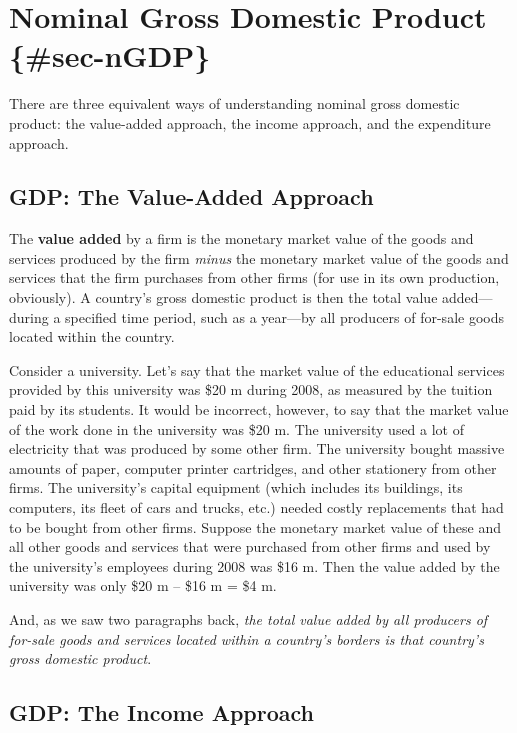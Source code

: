 \documentclass[
  letterpaper,
]{book}
\begin{document}
\section{\texorpdfstring{Nominal Gross Domestic Product \{\#sec-nGDP\}
}{Nominal Gross Domestic Product \{\#sec-nGDP\} }}\label{nominal-gross-domestic-product-sec-ngdp}

There are three equivalent ways of understanding nominal gross domestic
product: the value-added approach, the income approach, and the
expenditure approach.

\subsection{GDP: The Value-Added Approach}\label{sec-gdp-value-added}

The \textbf{value added} by a firm is the monetary
market value of the goods and services produced by the firm \emph{minus}
the monetary market value of the goods and services that the firm
purchases from other firms (for use in its own production, obviously). A
country's gross domestic product is then the total value added---during
a specified time period, such as a year---by all producers of for-sale
goods located within the country.

Consider a university. Let's say that the market value of the
educational services provided by this university was \$20 m during 2008,
as measured by the tuition paid by its students. It would be incorrect,
however, to say that the market value of the work done in the university
was \$20 m. The university used a lot of electricity that was produced
by some other firm. The university bought massive amounts of paper,
computer printer cartridges, and other stationery from other firms. The
university's capital equipment (which includes its buildings, its
computers, its fleet of cars and trucks, etc.) needed costly
replacements that had to be bought from other firms. Suppose the
monetary market value of these and all other goods and services that
were purchased from other firms and used by the university's employees
during 2008 was \$16 m. Then the value added by the university was only
\$20 m -- \$16 m = \$4 m.

And, as we saw two paragraphs back, \emph{the total value added by all
producers of for-sale goods and services located within a country's
borders is that country's gross domestic product}.

\subsection{GDP: The Income Approach}\label{sec-gdp-income}
\end{document}
